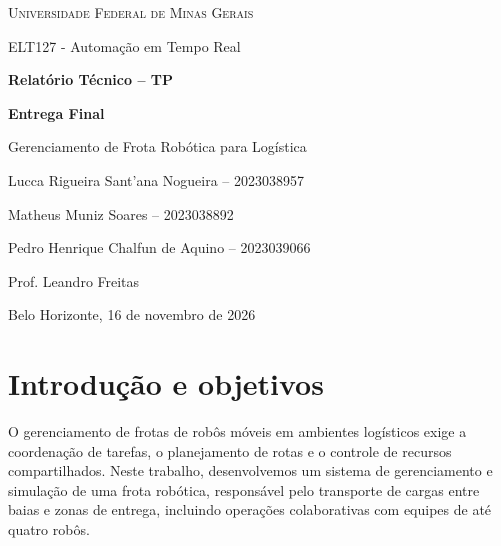 \documentclass[12pt,a4paper]{article}
\begin{document}
\begin{titlepage}
    \centering
    {\scshape\Large Universidade Federal de Minas Gerais\par}
    \vspace{0.7cm}
    {\large ELT127 - Automação em Tempo Real\par}
    \vspace{2.2cm}
    {\huge\bfseries Relatório Técnico -- TP\par}
    \vspace{0.45cm}
    {\Large\bfseries Entrega Final\par}
    \vspace{1.3cm}
    {\Large Gerenciamento de Frota Robótica para Logística\par}
    \vspace{2.0cm}
    \begin{center}
        \begin{minipage}{0.80\textwidth}
            \centering
            \vspace{0.5cm}
            {\large Lucca Rigueira Sant'ana Nogueira -- 2023038957 \par}
            {\large Matheus Muniz Soares -- 2023038892\par}
            {\large Pedro Henrique Chalfun de Aquino -- 2023039066\par}
            \vspace{0.55cm}
            {\large Prof. Leandro Freitas\par}
        \end{minipage}
    \end{center}
    \vfill
    {Belo Horizonte, 16 de novembro de 2026\par}
\end{titlepage}

\setlength{\columnsep}{1.1cm}
\footnotesize
\tableofcontents

\clearpage

\section{Introdução e objetivos}
\label{sec:introducao}

O gerenciamento de frotas de robôs móveis em ambientes logísticos exige a
coordenação de tarefas, o planejamento de rotas e o controle de recursos
compartilhados. Neste trabalho, desenvolvemos um sistema de gerenciamento e
simulação de uma frota robótica, responsável pelo transporte de cargas entre
baias e zonas de entrega, incluindo operações colaborativas com equipes de até
quatro robôs.
\end{document}
